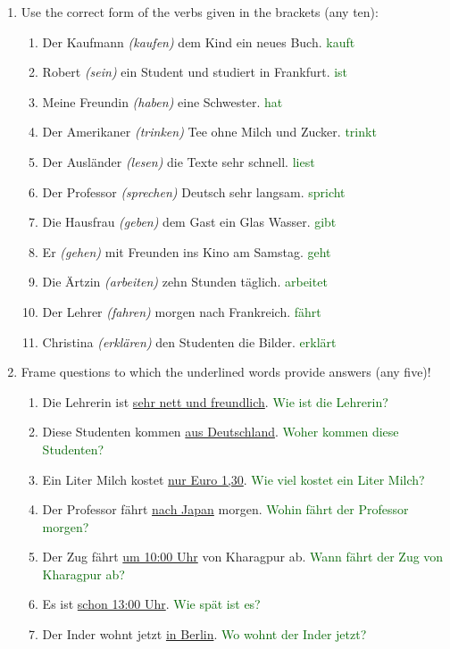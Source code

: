 \documentclass{article}
\begin{document}
\begin{enumerate}
    \item Use the correct form of the verbs given in the brackets (any ten):
    \begin{enumerate}
        \item Der Kaufmann \textit{(kaufen)} dem Kind ein neues Buch. \textcolor{darkgreen}{kauft}
        \item Robert \textit{(sein)} ein Student und studiert in Frankfurt. \textcolor{darkgreen}{ist}
        \item Meine Freundin \textit{(haben)} eine Schwester. \textcolor{darkgreen}{hat}
        \item Der Amerikaner \textit{(trinken)} Tee ohne Milch und Zucker. \textcolor{darkgreen}{trinkt}
        \item Der Ausländer \textit{(lesen)} die Texte sehr schnell. \textcolor{darkgreen}{liest}
        \item Der Professor \textit{(sprechen)} Deutsch sehr langsam. \textcolor{darkgreen}{spricht}
        \item Die Hausfrau \textit{(geben)} dem Gast ein Glas Wasser. \textcolor{darkgreen}{gibt}
        \item Er \textit{(gehen)} mit Freunden ins Kino am Samstag. \textcolor{darkgreen}{geht}
        \item Die Ärtzin \textit{(arbeiten)} zehn Stunden täglich. \textcolor{darkgreen}{arbeitet}
        \item Der Lehrer \textit{(fahren)} morgen nach Frankreich. \textcolor{darkgreen}{fährt}
        \item Christina \textit{(erklären)} den Studenten die Bilder. \textcolor{darkgreen}{erklärt}
    \end{enumerate}

    \item Frame questions to which the underlined words provide answers (any five)!
    \begin{enumerate}
        \item Die Lehrerin ist \underline{sehr nett und freundlich}. \textcolor{darkgreen}{Wie ist die Lehrerin?}
        \item Diese Studenten kommen \underline{aus Deutschland}. \textcolor{darkgreen}{Woher kommen diese Studenten?}
        \item Ein Liter Milch kostet \underline{nur Euro 1,30}. \textcolor{darkgreen}{Wie viel kostet ein Liter Milch?}
        \item Der Professor fährt \underline{nach Japan} morgen. \textcolor{darkgreen}{Wohin fährt der Professor morgen?}
        \item Der Zug fährt \underline{um 10:00 Uhr} von Kharagpur ab. \textcolor{darkgreen}{Wann fährt der Zug von Kharagpur ab?}
        \item Es ist \underline{schon 13:00 Uhr}. \textcolor{darkgreen}{Wie spät ist es?}
        \item Der Inder wohnt jetzt \underline{in Berlin}. \textcolor{darkgreen}{Wo wohnt der Inder jetzt?}
    \end{enumerate}


\end{enumerate}
\end{document}

